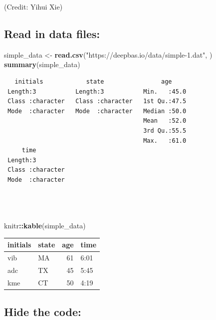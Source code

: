 \documentclass[
]{book}
\newenvironment{Shaded}{\begin{snugshade}}{\end{snugshade}}
\newcommand{\FunctionTok}[1]{\textcolor[rgb]{0.13,0.29,0.53}{\textbf{#1}}}
\newcommand{\NormalTok}[1]{#1}
\newcommand{\OtherTok}[1]{\textcolor[rgb]{0.56,0.35,0.01}{#1}}
\newcommand{\SpecialCharTok}[1]{\textcolor[rgb]{0.81,0.36,0.00}{\textbf{#1}}}
\newcommand{\StringTok}[1]{\textcolor[rgb]{0.31,0.60,0.02}{#1}}
\begin{document}
(Credit: Yihui Xie)

\hypertarget{read-in-data-files}{%
\subsection{Read in data files:}\label{read-in-data-files}}

\begin{Shaded}
\begin{Highlighting}[]
\NormalTok{simple\_data }\OtherTok{\textless{}{-}} \FunctionTok{read.csv}\NormalTok{(}\StringTok{"https://deepbas.io/data/simple{-}1.dat"}\NormalTok{, )}
\FunctionTok{summary}\NormalTok{(simple\_data) }
\end{Highlighting}
\end{Shaded}

\begin{verbatim}
   initials            state                age      
 Length:3           Length:3           Min.   :45.0  
 Class :character   Class :character   1st Qu.:47.5  
 Mode  :character   Mode  :character   Median :50.0  
                                       Mean   :52.0  
                                       3rd Qu.:55.5  
                                       Max.   :61.0  
     time          
 Length:3          
 Class :character  
 Mode  :character  
                   
                   
                   
\end{verbatim}

\begin{Shaded}
\begin{Highlighting}[]
\NormalTok{knitr}\SpecialCharTok{::}\FunctionTok{kable}\NormalTok{(simple\_data)}
\end{Highlighting}
\end{Shaded}

\begin{tabular}{l|l|r|l}
\hline
initials & state & age & time\\
\hline
vib & MA & 61 & 6:01\\
\hline
adc & TX & 45 & 5:45\\
\hline
kme & CT & 50 & 4:19\\
\hline
\end{tabular}

\hypertarget{hide-the-code}{%
\subsection{Hide the code:}\label{hide-the-code}}
\end{document}
